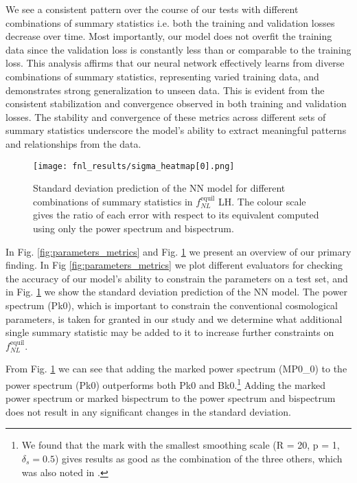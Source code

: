 We see a consistent pattern over the course of our tests with different combinations of summary statistics i.e. both the training and validation losses decrease over time. Most importantly, our model does not overfit the training data since the validation loss is constantly less than or comparable to the training loss. 
This analysis affirms that our neural network effectively learns from diverse combinations of summary statistics, representing varied training data, and demonstrates strong generalization to unseen data. This is evident from the consistent stabilization and convergence observed in both training and validation losses.
The stability and convergence of these metrics across different sets of summary statistics underscore the model's ability to extract meaningful patterns and relationships from the data. 
\begin{figure}[htbp]
    \centering
    \texttt{[image: fnl\_results/sigma\_heatmap[0].png]}
    \caption{Standard deviation prediction of the NN model for different combinations of summary statistics in $f_{NL}^\mathrm{equil}$ LH. The colour scale gives the ratio of each error with respect to its equivalent computed using only the power spectrum and bispectrum.}
    \label{fig:sigma_heatmap}
\end{figure}

In Fig. \ref{fig:parameters_metrics} and Fig. \ref{fig:sigma_heatmap} we present an overview of our primary finding. In Fig \ref{fig:parameters_metrics} we plot different evaluators for checking the accuracy of our model's ability to constrain the parameters on a test set, and in Fig. \ref{fig:sigma_heatmap} we show the standard deviation prediction of the NN model. The power spectrum (Pk0), which is important to constrain the conventional cosmological parameters, is taken for granted in our study and we determine what additional single summary statistic may be added to it to increase further constraints on $f_{NL}^{\mathrm{equil}}$.

From Fig. \ref{fig:sigma_heatmap} we can see that adding the marked power spectrum (MP0\_0) to the power spectrum (Pk0) outperforms both Pk0 and Bk0.\footnote{We found that the mark with the smallest smoothing scale (R = 20, p = 1, $\delta_s = 0.5$) gives results as good as the combination of the three others, which was also noted in \cite{jung2024quijotepngoptimizingsummarystatistics}.} Adding the marked power spectrum or marked bispectrum to the power spectrum and bispectrum does not result in any significant changes in the standard deviation.

